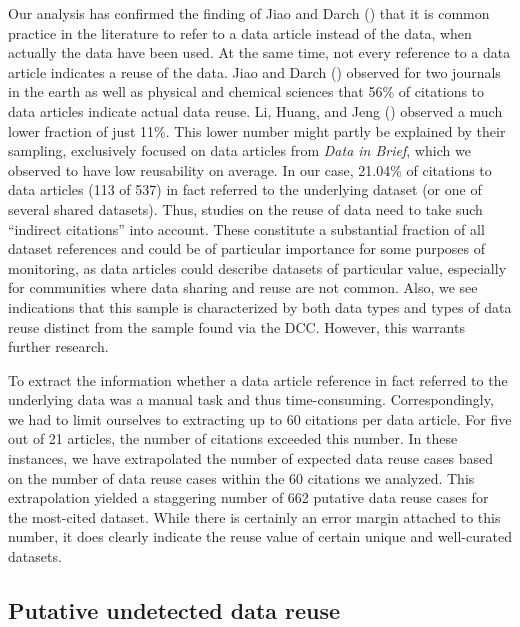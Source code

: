 \documentclass[
  letterpaper,
  DIV=11,
  numbers=noendperiod]{scrartcl}
\begin{document}
Our analysis has confirmed the finding of Jiao and Darch
() that it is common practice in the
literature to refer to a data article instead of the data, when actually
the data have been used. At the same time, not every reference to a data
article indicates a reuse of the data. Jiao and Darch
() observed for two journals in the earth
as well as physical and chemical sciences that 56\% of citations to data
articles indicate actual data reuse. Li, Huang, and Jeng
() observed a much lower
fraction of just 11\%. This lower number might partly be explained by
their sampling, exclusively focused on data articles from \emph{Data in
Brief}, which we observed to have low reusability on average. In our
case, 21.04\% of citations to data articles (113 of 537) in fact
referred to the underlying dataset (or one of several shared datasets).
Thus, studies on the reuse of data need to take such ``indirect
citations'' into account. These constitute a substantial fraction of all
dataset references and could be of particular importance for some
purposes of monitoring, as data articles could describe datasets of
particular value, especially for communities where data sharing and
reuse are not common. Also, we see indications that this sample is
characterized by both data types and types of data reuse distinct from
the sample found via the DCC. However, this warrants further research.

To extract the information whether a data article reference in fact
referred to the underlying data was a manual task and thus
time-consuming. Correspondingly, we had to limit ourselves to extracting
up to 60 citations per data article. For five out of 21 articles, the
number of citations exceeded this number. In these instances, we have
extrapolated the number of expected data reuse cases based on the number
of data reuse cases within the 60 citations we analyzed. This
extrapolation yielded a staggering number of 662 putative data reuse
cases for the most-cited dataset. While there is certainly an error
margin attached to this number, it does clearly indicate the reuse value
of certain unique and well-curated datasets.

\subsection{Putative undetected data
reuse}\label{sec-discussion-undetected}
\end{document}
